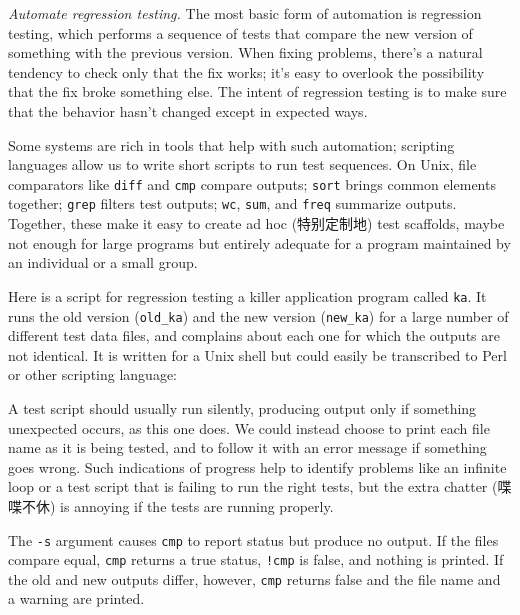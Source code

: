 \emph{Automate regression testing.} The most basic form of automation is
regression testing, which performs a sequence of tests that compare the new
version of something with the previous version. When fixing problems,
there's a natural tendency to check only that the fix works; it's easy to
overlook the possibility that the fix broke something else. The intent of
regression testing is to make sure that the behavior hasn't changed except
in expected ways.

Some systems are rich in tools that help with such automation; scripting
languages allow us to write short scripts to run test sequences. On Unix,
file comparators like \texttt{diff} and \texttt{cmp} compare outputs;
\texttt{sort} brings common elements together; \texttt{grep} filters test
outputs; \texttt{wc}, \texttt{sum}, and \texttt{freq} summarize outputs.
Together, these make it easy to create ad hoc (特别定制地) test scaffolds,
maybe not enough for large programs but entirely adequate for a program
maintained by an individual or a small group.

Here is a script for regression testing a killer application program called
\texttt{ka}. It runs the old version (\verb'old_ka') and the new version
(\verb'new_ka') for a large number of different test data files, and
complains about each one for which the outputs are not identical. It is
written for a Unix shell but could easily be transcribed to Perl or other
scripting language:

A test script should usually run silently, producing output only if
something unexpected occurs, as this one does. We could instead choose to
print each file name as it is being tested, and to follow it with an error
message if something goes wrong. Such indications of progress help to
identify problems like an infinite loop or a test script that is failing to
run the right tests, but the extra chatter (喋喋不休) is annoying if the
tests are running properly.

The \texttt{-s} argument causes \texttt{cmp} to report status but produce
no output. If the files compare equal, \texttt{cmp} returns a true status,
\texttt{!cmp} is false, and nothing is printed. If the old and new outputs
differ, however, \texttt{cmp} returns false and the file name and a warning
are printed.

